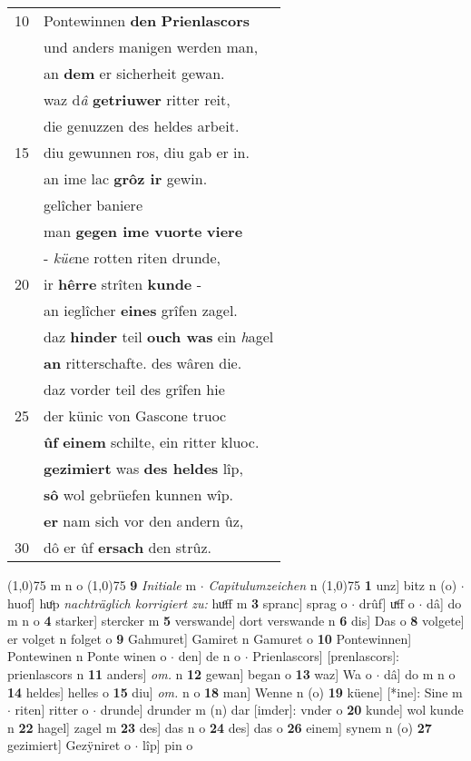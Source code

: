 \documentclass[8pt,a4paper,notitlepage]{article}
\begin{document}
\begin{table}[ht]
\begin{minipage}[t]{0.5\linewidth}
\begin{tabular}{rl}
10 & Pontewinnen \textbf{den} \textbf{Prienlascors}\\ 
 & und anders manigen werden man,\\ 
 & an \textbf{dem} er sicherheit gewan.\\ 
 & waz d\textit{â} \textbf{getriuwer} ritter reit,\\ 
 & die genuzzen des heldes arbeit.\\ 
15 & diu gewunnen ros, diu gab er in.\\ 
 & an ime lac \textbf{grôz ir} gewin.\\ 
 & gelîcher baniere\\ 
 & man \textbf{gegen ime vuorte} \textbf{viere}\\ 
 & - \textit{küe}ne rotten riten drunde,\\ 
20 & ir \textbf{hêrre} strîten \textbf{kunde} -\\ 
 & an ieglîcher \textbf{eines} grîfen zagel.\\ 
 & daz \textbf{hinder} teil \textbf{ouch was} ein \textit{h}agel\\ 
 & \textbf{an} ritterschafte. des wâren die.\\ 
 & daz vorder teil des grîfen hie\\ 
25 & der künic von Gascone truoc\\ 
 & \textbf{ûf} \textbf{einem} schilte, ein ritter kluoc.\\ 
 & \textbf{gezimiert} was \textbf{des heldes} lîp,\\ 
 & \textbf{sô} wol gebrüefen kunnen wîp.\\ 
 & \textbf{er} nam sich vor den andern ûz,\\ 
30 & dô er ûf \textbf{ersach} den strûz.\\ 
\end{tabular}
\scriptsize
\line(1,0){75} \newline
m n o \newline
\line(1,0){75} \newline
\textbf{9} \textit{Initiale} m   $\cdot$ \textit{Capitulumzeichen} n  \newline
\line(1,0){75} \newline
\textbf{1} unz] bitz n (o)  $\cdot$ huof] huͦp \textit{nachträglich korrigiert zu:} huͦff m \textbf{3} spranc] sprag o  $\cdot$ drûf] uͯff o  $\cdot$ dâ] do m n o \textbf{4} starker] stercker m \textbf{5} verswande] dort verswande n \textbf{6} dis] Das o \textbf{8} volgete] er volget n folget o \textbf{9} Gahmuret] Gamiret n Gamuret o \textbf{10} Pontewinnen] Pontewinen n Ponte winen o  $\cdot$ den] de n o  $\cdot$ Prienlascors] [prenlascors]: prienlascors n \textbf{11} anders] \textit{om.} n \textbf{12} gewan] began o \textbf{13} waz] Wa o  $\cdot$ dâ] do m n o \textbf{14} heldes] helles o \textbf{15} diu] \textit{om.} n o \textbf{18} man] Wenne n (o) \textbf{19} küene] [*ine]: Sine m  $\cdot$ riten] ritter o  $\cdot$ drunde] drunder m (n) dar [imder]: vnder  o \textbf{20} kunde] wol kunde n \textbf{22} hagel] zagel m \textbf{23} des] das n o \textbf{24} des] das o \textbf{26} einem] synem n (o) \textbf{27} gezimiert] Gezÿniret o  $\cdot$ lîp] pin o \newline

\end{minipage}
\end{table}
\end{document}
